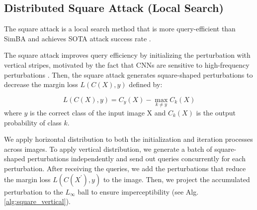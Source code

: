 
\subsection{Distributed Square Attack (Local Search)}

The square attack is a local search method that is more query-efficient than SimBA and achieves SOTA attack success rate \citep{andriushchenko2020square}. 

The square attack improves query efficiency by initializing the perturbation with vertical stripes, motivated by the fact that CNNs are sensitive to high-frequency perturbations \citep{yin2019fourier}. Then, the square attack generates square-shaped perturbations to decrease the margin loss $L(C(X), y)$ defined by:

$$ L(C(X), y)= C_y(X)-\max_{k \neq y}C_k(X)$$
where $y$ is the correct class of the input image X and $C_k(X)$ is the output probability of class $k$.

We apply horizontal distribution to both the initialization and iteration processes across images. To apply vertical distribution, we generate a batch of square-shaped perturbations independently and send out queries concurrently for each perturbation. After receiving the queries, we add the perturbations that reduce the margin loss $L(C(X^{'}), y)$ to the image. Then, we project the accumulated perturbation to the $L_\infty$ ball to ensure imperceptibility (see Alg. \ref{alg:square_vertical}).


